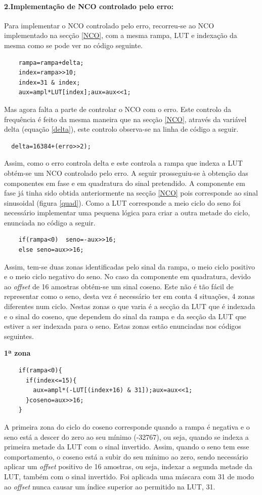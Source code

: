 \documentclass[11pt]{article}
\numberwithin{equation}{section}
\begin{document}
\paragraph{2.Implementação de NCO controlado pelo erro:} \hspace{0pt}

Para implementar o NCO controlado pelo erro, recorreu-se ao NCO implementado na secção \ref{NCO}, com a mesma rampa, LUT e indexação da mesma como se pode ver no código seguinte.
\begin{lstlisting}
	rampa=rampa+delta;
	index=rampa>>10;
	index=31 & index;
	aux=ampl*LUT[index];aux=aux<<1;
\end{lstlisting}
Mas agora falta a parte de controlar o NCO com o erro. Este controlo da frequência é feito da mesma maneira que na secção \ref{NCO}, através da variável delta (equação \ref{delta}), este controlo observa-se na linha de código a seguir.
\begin{lstlisting}
  delta=16384+(erro>>2);
\end{lstlisting}
Assim, como o erro controla delta e este controla a rampa que indexa a LUT obtém-se um NCO controlado pelo erro.
A seguir prosseguiu-se à obtenção das componentes em fase e em quadratura do sinal pretendido. A componente em fase já tinha sido obtida anteriormente na secção \ref{NCO} pois corresponde ao sinal sinusoidal (figura \ref{quad}). Como a LUT corresponde a meio ciclo do seno foi necessário implementar uma pequena lógica para criar a outra metade do ciclo, enunciada no código a seguir.
\begin{lstlisting}
	if(rampa<0)  seno=-aux>>16;
	else seno=aux>>16;
\end{lstlisting}
Assim, tem-se duas zonas identificadas pelo sinal da rampa, o meio ciclo positivo e o meio ciclo negativo do seno.
No caso da componente em quadratura, devido ao \textit{offset} de 16 amostras obtém-se um sinal coseno. Este não é tão fácil de representar como o seno, desta vez é necessário ter em conta 4 situações, 4 zonas diferentes num ciclo. Nestas zonas o que varia é a secção da LUT que é indexada e o sinal do coseno, que dependem do sinal da rampa e da secção da LUT que estiver a ser indexada para o seno. Estas zonas estão enunciadas nos códigos seguintes.
\vspace{1mm}

\textbf{1ª zona}
\begin{lstlisting}
	if(rampa<0){
	  if(index<=15){
	    aux=ampl*(-LUT[(index+16) & 31]);aux=aux<<1;
	  }coseno=aux>>16;
	}
\end{lstlisting}
A primeira zona do ciclo do coseno corresponde quando a rampa é negativa e o seno está a descer do zero ao seu mínimo (-32767), ou seja, quando se indexa a primeira metade da LUT com o sinal invertido. Assim, quando o seno tem esse comportamento, o coseno está a subir do seu mínimo ao zero, sendo necessário aplicar um \textit{offset} positivo de 16 amostras, ou seja, indexar a segunda metade da LUT, também com o sinal invertido. Foi aplicada uma máscara com 31 de modo ao \textit{offset} nunca causar um índice superior ao permitido na LUT, 31.
\vspace{1mm}
\end{document}
